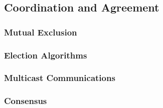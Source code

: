 \subsection{Coordination and Agreement}

\subsubsection*{Mutual Exclusion}

\subsubsection*{Election Algorithms}

\subsubsection*{Multicast Communications}

\subsubsection*{Consensus}
